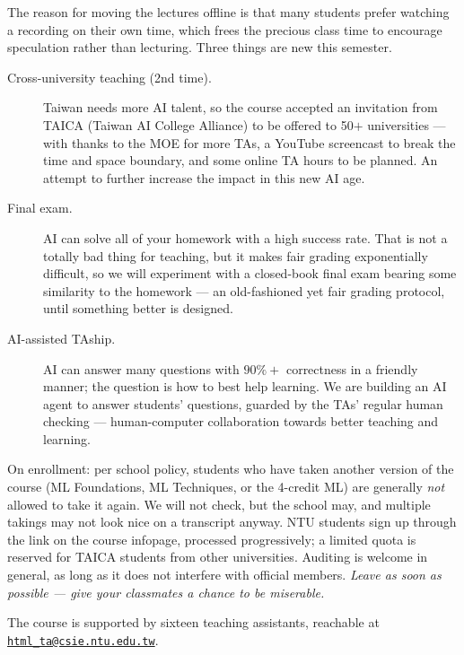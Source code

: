 \documentclass[a4paper,oneside]{scrbook}
\begin{document}
The reason for moving the lectures offline is that many students prefer watching
a recording on their own time, which frees the precious class time to encourage
speculation rather than lecturing. Three things are new this semester.

\begin{description}
    \item[Cross-university teaching (2nd time).] Taiwan needs more AI talent, so
        the course accepted an invitation from TAICA (Taiwan AI College Alliance)
        to be offered to 50\(+\) universities --- with thanks to the MOE for
        more TAs, a YouTube screencast to break the time and space boundary, and
        some online TA hours to be planned. An attempt to further increase the
        impact in this new AI age.
    \item[Final exam.] AI can solve all of your homework with a high success
        rate. That is not a totally bad thing for teaching, but it makes fair
        grading exponentially difficult, so we will experiment with a
        closed-book final exam bearing some similarity to the homework --- an
        old-fashioned yet fair grading protocol, until something better is
        designed.
    \item[AI-assisted TAship.] AI can answer many questions with \(90\%+\)
        correctness in a friendly manner; the question is how to best help
        learning. We are building an AI agent to answer students' questions,
        guarded by the TAs' regular human checking --- human-computer
        collaboration towards better teaching and learning.
\end{description}

On enrollment: per school policy, students who have taken another version of the
course (ML Foundations, ML Techniques, or the 4-credit ML) are generally
\emph{not} allowed to take it again. We will not check, but the school may, and
multiple takings may not look nice on a transcript anyway. NTU students sign up
through the link on the course infopage, processed progressively; a limited
quota is reserved for TAICA students from other universities. Auditing is
welcome in general, as long as it does not interfere with official members.
\emph{Leave as soon as possible --- give your classmates a chance to be
miserable.}

The course is supported by sixteen teaching assistants, reachable at
\href{mailto:html_ta@csie.ntu.edu.tw}{\nolinkurl{html_ta@csie.ntu.edu.tw}}.
\end{document}
